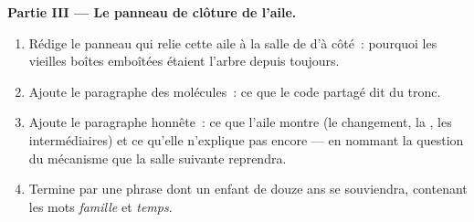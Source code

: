 \begin{problem}
\medskip\noindent\textbf{Partie III --- Le panneau de
clôture de l'aile.}
\begin{enumerate}[resume]
  \item Rédige le panneau qui relie cette aile à la salle
        de  d'à côté~: pourquoi les vieilles
        boîtes emboîtées étaient l'arbre depuis toujours.
  \item Ajoute le paragraphe des molécules~: ce que le code
        partagé dit du tronc.
  \item Ajoute le paragraphe honnête~: ce que l'aile montre
        (le changement, la , les intermédiaires) et
        ce qu'elle n'explique pas encore --- en nommant la
        question du mécanisme que la salle suivante
        reprendra.
  \item Termine par une phrase dont un enfant de douze ans
        se souviendra, contenant les mots \emph{famille}
        et \emph{temps}.
\end{enumerate}
\end{problem}
